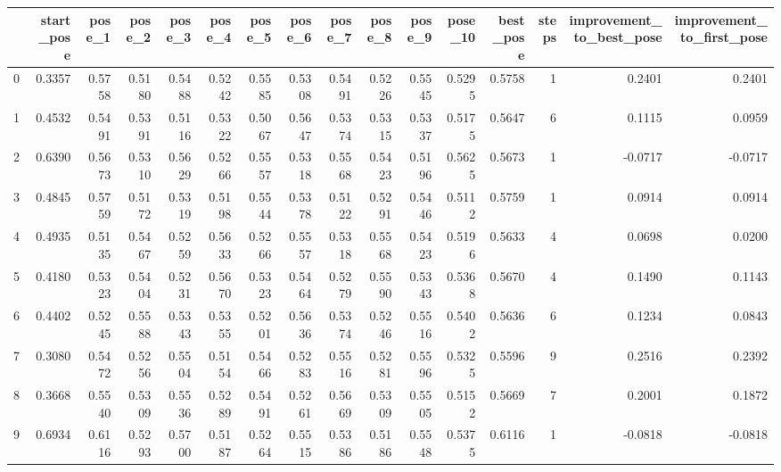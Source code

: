 \begin{tabular}{lrrrrrrrrrrrrrrr}
\toprule
{} &  start\_pose &  pose\_1 &  pose\_2 &  pose\_3 &  pose\_4 &  pose\_5 &  pose\_6 &  pose\_7 &  pose\_8 &  pose\_9 &  pose\_10 &  best\_pose &  steps &  improvement\_to\_best\_pose &  improvement\_to\_first\_pose \\
\midrule
0 &      0.3357 &  0.5758 &  0.5180 &  0.5488 &  0.5242 &  0.5585 &  0.5308 &  0.5491 &  0.5226 &  0.5545 &   0.5295 &     0.5758 &      1 &                    0.2401 &                     0.2401 \\
1 &      0.4532 &  0.5491 &  0.5391 &  0.5116 &  0.5322 &  0.5067 &  0.5647 &  0.5374 &  0.5315 &  0.5337 &   0.5175 &     0.5647 &      6 &                    0.1115 &                     0.0959 \\
2 &      0.6390 &  0.5673 &  0.5310 &  0.5629 &  0.5266 &  0.5557 &  0.5318 &  0.5568 &  0.5423 &  0.5196 &   0.5625 &     0.5673 &      1 &                   -0.0717 &                    -0.0717 \\
3 &      0.4845 &  0.5759 &  0.5172 &  0.5319 &  0.5198 &  0.5544 &  0.5378 &  0.5122 &  0.5291 &  0.5446 &   0.5112 &     0.5759 &      1 &                    0.0914 &                     0.0914 \\
4 &      0.4935 &  0.5135 &  0.5467 &  0.5259 &  0.5633 &  0.5266 &  0.5557 &  0.5318 &  0.5568 &  0.5423 &   0.5196 &     0.5633 &      4 &                    0.0698 &                     0.0200 \\
5 &      0.4180 &  0.5323 &  0.5404 &  0.5231 &  0.5670 &  0.5323 &  0.5464 &  0.5279 &  0.5590 &  0.5343 &   0.5368 &     0.5670 &      4 &                    0.1490 &                     0.1143 \\
6 &      0.4402 &  0.5245 &  0.5588 &  0.5343 &  0.5355 &  0.5201 &  0.5636 &  0.5374 &  0.5246 &  0.5516 &   0.5402 &     0.5636 &      6 &                    0.1234 &                     0.0843 \\
7 &      0.3080 &  0.5472 &  0.5256 &  0.5504 &  0.5154 &  0.5466 &  0.5283 &  0.5516 &  0.5281 &  0.5596 &   0.5325 &     0.5596 &      9 &                    0.2516 &                     0.2392 \\
8 &      0.3668 &  0.5540 &  0.5309 &  0.5536 &  0.5289 &  0.5491 &  0.5261 &  0.5669 &  0.5309 &  0.5505 &   0.5152 &     0.5669 &      7 &                    0.2001 &                     0.1872 \\
9 &      0.6934 &  0.6116 &  0.5293 &  0.5700 &  0.5187 &  0.5264 &  0.5515 &  0.5386 &  0.5186 &  0.5548 &   0.5375 &     0.6116 &      1 &                   -0.0818 &                    -0.0818 \\
\bottomrule
\end{tabular}
